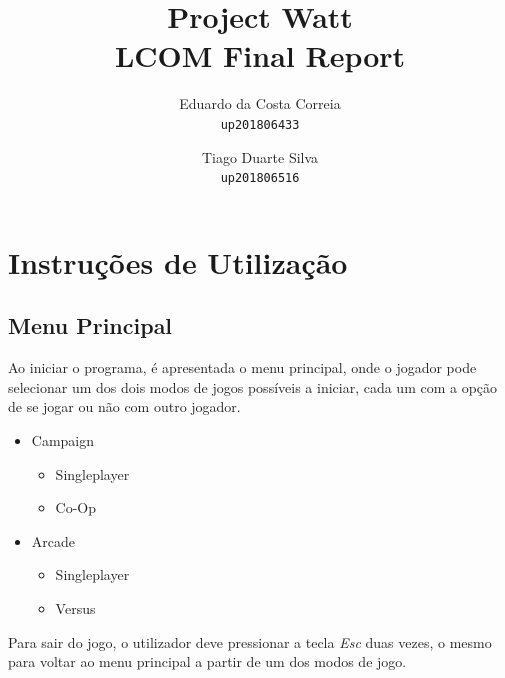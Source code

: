 \documentclass{report}
\begin{document}
\title{\textbf{Project Watt} \\ LCOM Final Report}
	\author{Eduardo da Costa Correia\\
	\texttt{up201806433}
	\and
	Tiago Duarte Silva\\
	\texttt{up201806516}}   
\maketitle

\tableofcontents

\chapter{Instruções de Utilização} 

\section{Menu Principal}

Ao iniciar o programa, é apresentada o menu principal, onde o jogador pode selecionar um dos dois modos de jogos possíveis a iniciar, cada um com a opção de se jogar ou não com outro jogador.

\begin{itemize}
	\item Campaign

	\begin{itemize}
		\item Singleplayer 
		\item Co-Op
	\end{itemize}
	
	\item Arcade
	
	\begin{itemize}
		\item Singleplayer 
		\item Versus
	\end{itemize}
\end{itemize}

Para sair do jogo, o utilizador deve pressionar a tecla \textit{Esc} duas vezes, o mesmo para voltar ao menu principal a partir de um dos modos de jogo.
\end{document}

